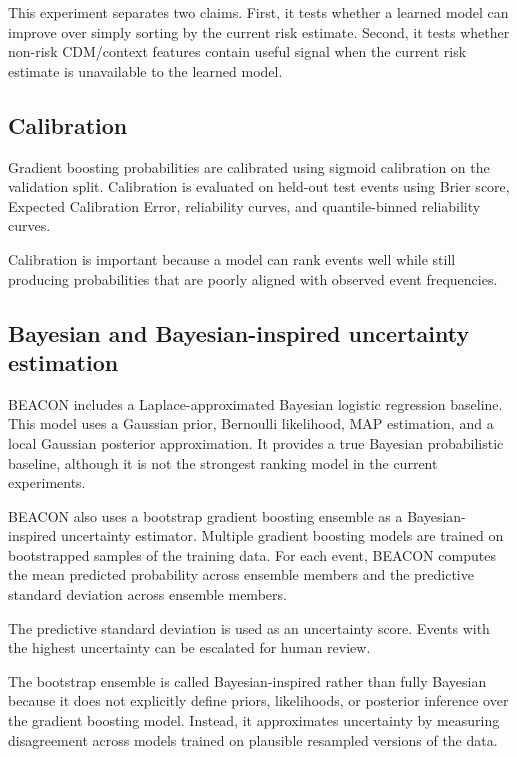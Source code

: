 \documentclass[11pt]{article}
\begin{document}
This experiment separates two claims. First, it tests whether a learned model can improve over simply sorting by the current risk estimate. Second, it tests whether non-risk CDM/context features contain useful signal when the current risk estimate is unavailable to the learned model.

\subsection{Calibration}

Gradient boosting probabilities are calibrated using sigmoid calibration on the validation split. Calibration is evaluated on held-out test events using Brier score, Expected Calibration Error, reliability curves, and quantile-binned reliability curves.

Calibration is important because a model can rank events well while still producing probabilities that are poorly aligned with observed event frequencies.

\subsection{Bayesian and Bayesian-inspired uncertainty estimation}

BEACON includes a Laplace-approximated Bayesian logistic regression baseline. This model uses a Gaussian prior, Bernoulli likelihood, MAP estimation, and a local Gaussian posterior approximation. It provides a true Bayesian probabilistic baseline, although it is not the strongest ranking model in the current experiments.

BEACON also uses a bootstrap gradient boosting ensemble as a Bayesian-inspired uncertainty estimator. Multiple gradient boosting models are trained on bootstrapped samples of the training data. For each event, BEACON computes the mean predicted probability across ensemble members and the predictive standard deviation across ensemble members.

The predictive standard deviation is used as an uncertainty score. Events with the highest uncertainty can be escalated for human review.

The bootstrap ensemble is called Bayesian-inspired rather than fully Bayesian because it does not explicitly define priors, likelihoods, or posterior inference over the gradient boosting model. Instead, it approximates uncertainty by measuring disagreement across models trained on plausible resampled versions of the data.
\end{document}
